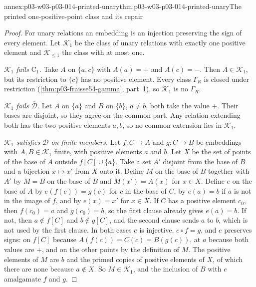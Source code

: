 \begin{annexitem}{annex:p03-w03-p03-014-printed-unary}{thm:p03-w03-p03-014-printed-unary}{The printed one-positive-point class and its repair}
\begin{proof}
For unary relations an embedding is an injection preserving the sign of
every element. Let \(\mathcal K_1\) be the class of unary relations with
exactly one positive element and \(\mathcal K_{\leq1}\) the class with
at most one.

\emph{\(\mathcal K_1\) fails \(\mathrm C_1\).} Take \(A\) on
\(\{a,c\}\) with \(A(a)=+\) and \(A(c)=-\). Then \(A\in\mathcal K_1\),
but its restriction to \(\{c\}\) has no positive element. Every class
\(\Gamma_R\) is closed under restriction
(\cref{thm:p03-fraisse54-gamma}, part~1), so \(\mathcal K_1\) is no
\(\Gamma_R\).

\emph{\(\mathcal K_1\) fails \(\overline{\mathcal D}\).} Let \(A\) on
\(\{a\}\) and \(B\) on \(\{b\}\), \(a\neq b\), both take the value
\(+\). Their bases are disjoint, so they agree on the common part. Any
relation extending both has the two positive elements \(a,b\), so no
common extension lies in \(\mathcal K_1\).

\emph{\(\mathcal K_1\) satisfies \(\mathcal D\) on finite members.}
Let \(f:C\to A\) and \(g:C\to B\) be embeddings with
\(A,B\in\mathcal K_1\) finite, with positive elements \(a\) and \(b\).
Let \(X\) be the set of points of the base of \(A\) outside
\(f[C]\cup\{a\}\). Take a set \(A'\) disjoint from the base of \(B\) and
a bijection \(x\mapsto x'\) from \(X\) onto it. Define \(M\) on the base
of \(B\) together with \(A'\) by \(M=B\) on the base of \(B\) and
\(M(x')=A(x)\) for \(x\in X\). Define \(e\) on the base of \(A\) by
\(e(f(c))=g(c)\) for \(c\) in the base of \(C\), by \(e(a)=b\) if
\(a\) is not in the image of \(f\), and by \(e(x)=x'\) for \(x\in X\).
If \(C\) has a positive element \(c_0\), then \(f(c_0)=a\) and
\(g(c_0)=b\), so the first clause already gives \(e(a)=b\). If not,
then \(a\notin f[C]\) and \(b\notin g[C]\), and the second clause sends
\(a\) to \(b\), which is not used by the first clause. In both cases
\(e\) is injective, \(e\circ f=g\), and \(e\) preserves signs: on
\(f[C]\) because \(A(f(c))=C(c)=B(g(c))\), at \(a\) because both values
are \(+\), and on the other points by the definition of \(M\). The
positive elements of \(M\) are \(b\) and the primed copies of positive
elements of \(X\), of which there are none because \(a\notin X\).
So \(M\in\mathcal K_1\), and the inclusion of \(B\) with \(e\) amalgamate
\(f\) and \(g\).


\end{proof}
\end{annexitem}
